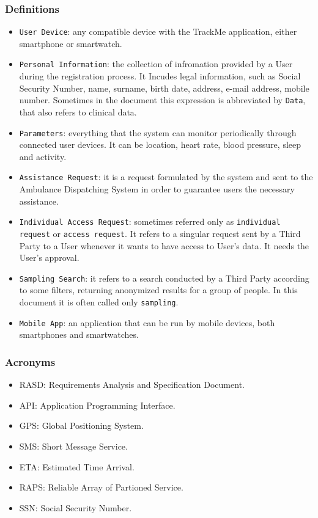 \documentclass[12pt,a4paper]{article}
\begin{document}
		\subsubsection{Definitions}
			\begin{itemize}
				\item \texttt{User Device}: any compatible device with the TrackMe application, either smartphone or smartwatch.
				\item \texttt{Personal Information}: the collection of infromation provided by a User during the registration process. It Incudes legal information, such as Social Security Number, name, surname, birth date, address, e-mail address, mobile number. Sometimes in the document this expression is abbreviated by \texttt{Data}, that also refers to clinical data.
				\item \texttt{Parameters}: everything that the system can monitor periodically through connected user devices. It can be location, heart rate, blood pressure, sleep and activity.
				\item \texttt{Assistance Request}: it is a request formulated by the system and sent to the Ambulance Dispatching System in order to guarantee users the necessary assistance.
				\item \texttt{Individual Access Request}: sometimes referred only as \texttt{individual request} or \texttt{access request}. It refers to a singular request sent by a Third Party to a User whenever it wants to have access to User's data. It needs the User's approval. 
				\item \texttt{Sampling Search}: it refers to a search conducted by a Third Party according to some filters, returning anonymized results for a group of people. In this document it is often called only \texttt{sampling}.
				\item \texttt{Mobile App}: an application that can be run by mobile devices, both smartphones and smartwatches.
			\end{itemize}
		\subsubsection{Acronyms}
			\begin{itemize}
				\item RASD: Requirements Analysis and Specification Document.
				\item API: Application Programming Interface.
				\item GPS: Global Positioning System.
				\item SMS: Short Message Service.
				\item ETA: Estimated Time Arrival.
				\item RAPS: Reliable Array of Partioned Service.
				\item SSN: Social Security Number.
			\end{itemize}
\end{document}
